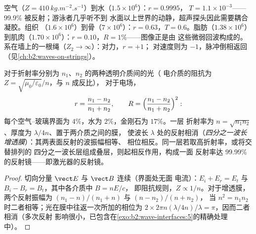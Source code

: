 \begin{example}[三个界面处的声波]\label{ex:b2:wave-interfaces:sound}
空气（$Z = \qty{410}{kg.m^{-2}.s^{-1}}$）到水（$1.5 \times 10^6$）：$r = 0.9995$，
$T = 1.1 \times 10^{-3}$——$99.9\%$ 被反射；游泳者几乎听不到
水面以上世界的动静，超声探头因此需要耦合凝胶。组织
（$1.6 \times 10^6$）到骨（$7 \times 10^6$）：$r = 0.63$，$T = 0.6$。脂肪（$1.38 \times
10^6$）到肌肉（$1.70 \times 10^6$）：$r = 0.10$，$R = 1\%$——图像正是由
这些微弱回波构成的。系在墙上的一根绳（$Z_2 \to \infty$）：对力，$r = +1$；
对速度则为 $-1$，脉冲倒相返回
（见\cref{ch:b2:waves-on-strings}）。
\end{example}

\begin{proposition}\label{prop:b2:wave-interfaces:optics}
对于折射率分别为 $n_1$、$n_2$ 的两种透明介质间的光（
电介质的阻抗为 $Z = \sqrt{\mu_0/\varepsilon_0}/n$，与 $n$ 成反比），
对于电场，
\[
r = \frac{n_1 - n_2}{n_1 + n_2} , \qquad R = \Bigl(\frac{n_1 - n_2}{n_1 + n_2}\Bigr)^2 :
\]
每个空气–玻璃界面为 $4\%$，水为 $2\%$，金刚石为 $17\%$。一层
折射率为 $n = \sqrt{n_1n_2}$、厚度为 $\lambda/4n$、置于两介质之间的膜，
使波长 $\lambda$ 处的反射相消（\emph{四分之一波长
增透膜}）：其两表面反射的波振幅相等、
相位相反。同一层若取高折射率，或将交替排列的
四分之一波长层组成叠层，则起相反作用，构成一面
反射率达 $99.99\%$ 的反射镜——即激光器的反射镜。
\end{proposition}

\begin{proof}
切向分量 $\vect E$ 与 $\vect B$ 连续（界面处无面
电流）：$E_i + E_r = E_t$ 与 $B_i - B_r = B_t$，其中各介质中 $B = nE/c$，
即阻抗规则，$Z \propto 1/n$。对于增透膜，两个反射振幅为
$(n_1 - n)/(n_1 + n)$ 与 $(n - n_2)/(n + n_2)$，
当 $n^2 = n_1n_2$ 时二者相等；光在膜中往返一次所加的相位为
$2\times2\pi n(\lambda/4n)/\lambda = \pi$，因而二者相消（多次反射
影响很小，已包含在\cref{exo:b2:wave-interfaces:5}的精确处理中）。
\end{proof}

